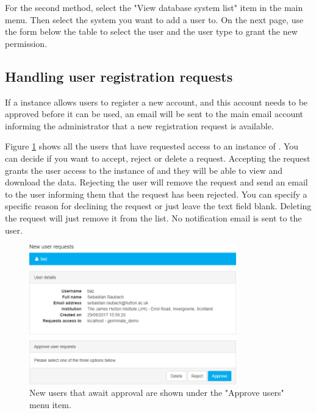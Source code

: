 For the second method, select the "View database system list" item in the main menu. Then select the system you want to add a user to. On the next page, use the form below the table to select the user and the user type to grant the new permission.

\subsection{Handling user registration requests}
If a {\germinate} instance allows users to register a new account, and this account needs to be approved before it can be used, an email will be sent to the main {\gatekeeper} email account informing the administrator that a new registration request is available.

Figure \ref{fig:gatekeeper:access-request} shows all the users that have requested access to an instance of {\germinate}. You can decide if you want to accept, reject or delete a request. Accepting the request grants the user access to the instance of {\germinate} and they will be able to view and download the data. Rejecting the user will remove the request and send an email to the user informing them that the request has been rejected. You can specify a specific reason for declining the request or just leave the text field blank. Deleting the request will just remove it from the list. No notification email is sent to the user.

\begin{figure}
	\centering
	\includegraphics[width=0.8\textwidth]{img/gatekeeper/access-request.png}
	\caption{New users that await approval are shown under the "Approve users" menu item.}
	\label{fig:gatekeeper:access-request}
\end{figure}
